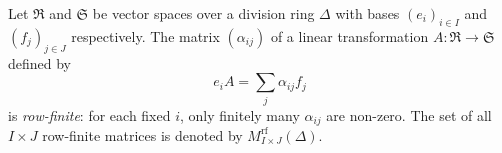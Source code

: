Let $\mathfrak{R}$ and $\mathfrak{S}$ be vector spaces over a division ring $\Delta$ with bases $(e_i)_{i \in I}$ and $(f_j)_{j \in J}$ respectively. The matrix $(\alpha_{ij})$ of a linear transformation $A: \mathfrak{R} \to \mathfrak{S}$ defined by
$$e_i A = \sum_j \alpha_{ij} f_j$$
is \textit{row-finite}: for each fixed $i$, only finitely many $\alpha_{ij}$ are non-zero. The set of all $I \times J$ row-finite matrices is denoted by $M_{I \times J}^{\text{rf}}(\Delta)$.
